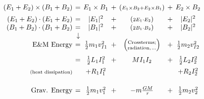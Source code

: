 \documentclass[12pt]{article}
\newcommand{\hs}{\hspace{1pt}} %
\begin{document}
\begin{minipage}[t]{.5\textwidth}
	\vspace{15pt}
	
	\[
		\arraycolsep=2pt\begin{array}{r c c c c c c}
			(E_1 + E_2) \times (B_1 + B_2) & = 
				& E_1 \times B_1 
				& + 
				& ( {\scriptstyle E_1 \times B_2 + E_2 \times B_1} )
				& + 
				& E_2 \times B_2
				\\[5pt]
			(E_1 + E_2) \cdot (E_1 + E_2) & = 
				& | E_1 |^2
				& + 
				& ( {\scriptstyle 2 E_1 \cdot E_2} )
				& + 
				& | E_2 |^2
				\\
			(B_1 + B_2) \cdot (B_1 + B_2) & = 
				& | B_1 |^2
				& + 
				& ( {\scriptstyle 2 B_1 \cdot B_2} )
				& + 
				& | B_2 |^2
				\\
			& \hs \downarrow
				\\[-3pt]
			\text{E\&M Energy} & = 
				& \tfrac{1}{2} m_1 v_{I1}^2 
				& + 
				& \Big( \begin{gathered}
						\text{\scriptsize Crossterms;}\\[-7pt]
						\text{\scriptsize radiation,\hs ...}
					\end{gathered} \Big)
				& + 
				& \tfrac{1}{2} m_2 v_{I2}^2 
				\\[10pt]
			& = 
				& \tfrac{1}{2} L_1 I_1^2 
				& + 
				& M I_1 I_2
				& + 
				& \tfrac{1}{2} L_2 I_2^2
				\\[5pt]
			\text{\scriptsize(heat dissipation)} & 
				& + R_1 I_1^2 
				&  
				& 
				&  
				& + R_2 I_2^2
				\\[15pt]
			\text{Grav. Energy} & =
				& \tfrac{1}{2} m_1 v_1^2 
				& + 
				& - m \tfrac{GM}{r}
				& + 
				& \tfrac{1}{2} m_2 v_2^2 
		\end{array}
	\]

\end{minipage}
\hfill\hs


%
%
\newpage

\end{document}
